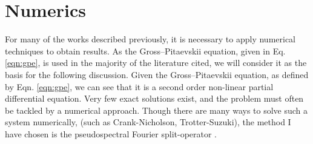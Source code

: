 \section{Numerics}\label{sec:numerics}
For many of the works described previously, it is necessary to apply numerical techniques to obtain results. As the Gross--Pitaevskii
equation, given in Eq. \eqref{eqn:gpe}, is used in the majority of the literature cited, we will consider it as the basis for the following discussion. Given the Gross--Pitaevskii equation, as defined by Eqn. \ref{eqn:gpe}, we can see that it is a second order non-linear partial differential
equation. Very few exact solutions exist, and the problem must often be tackled by a numerical approach. Though there are many ways to solve such
a system numerically, (such as Crank-Nicholson, Trotter-Suzuki), the method I have chosen is the pseudospectral Fourier split-operator \cite{Num:Bauke_cpc_2011}.

